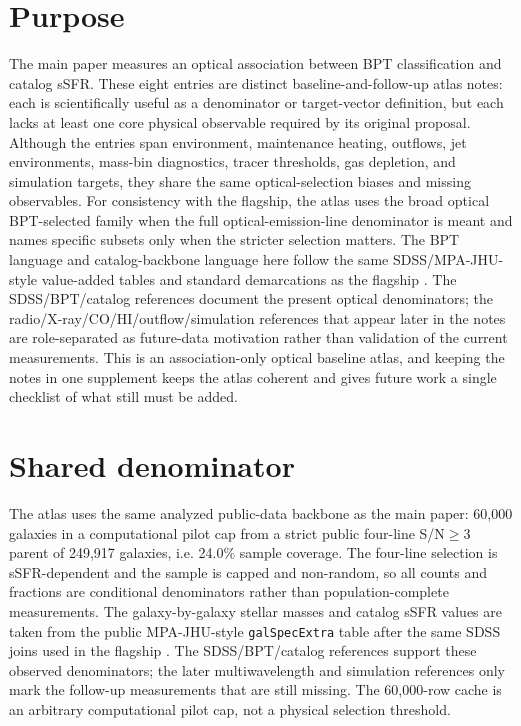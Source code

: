 \documentclass[twocolumn]{aastex631}
\begin{document}
\section{Purpose}
The main paper measures an optical association between BPT classification and catalog sSFR. These eight entries are distinct baseline-and-follow-up atlas notes: each is scientifically useful as a denominator or target-vector definition, but each lacks at least one core physical observable required by its original proposal. Although the entries span environment, maintenance heating, outflows, jet environments, mass-bin diagnostics, tracer thresholds, gas depletion, and simulation targets, they share the same optical-selection biases and missing observables. For consistency with the flagship, the atlas uses the broad optical BPT-selected family when the full optical-emission-line denominator is meant and names specific subsets only when the stricter selection matters. The BPT language and catalog-backbone language here follow the same SDSS/MPA-JHU-style value-added tables and standard demarcations as the flagship \citep{sdssdr17,brinchmann2004,york2000,baldwin1981,kewley2001,kauffmann2003bpt,kewley2006,stasinska2008,stasinska2015}. The SDSS/BPT/catalog references document the present optical denominators; the radio/X-ray/CO/HI/outflow/simulation references that appear later in the notes are role-separated as future-data motivation rather than validation of the current measurements. This is an association-only optical baseline atlas, and keeping the notes in one supplement keeps the atlas coherent and gives future work a single checklist of what still must be added.

\section{Shared denominator}
The atlas uses the same analyzed public-data backbone as the main paper: 60,000 galaxies in a computational pilot cap from a strict public four-line S/N$\geq3$ parent of 249,917 galaxies, i.e. 24.0\% sample coverage. The four-line selection is sSFR-dependent and the sample is capped and non-random, so all counts and fractions are conditional denominators rather than population-complete measurements. The galaxy-by-galaxy stellar masses and catalog sSFR values are taken from the public MPA-JHU-style \texttt{galSpecExtra} table after the same SDSS joins used in the flagship \citep{sdssdr17,brinchmann2004,york2000}. The SDSS/BPT/catalog references support these observed denominators; the later multiwavelength and simulation references only mark the follow-up measurements that are still missing. The 60,000-row cache is an arbitrary computational pilot cap, not a physical selection threshold.
\end{document}
